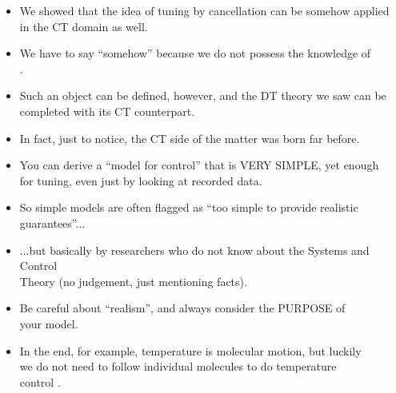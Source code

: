 \begin{frame}
\myPause
 \begin{itemize}[<+-| alert@+>]
 \item We showed that the idea of tuning by cancellation can be somehow applied\\
       in the CT domain as well.
 \item We have to say ``somehow'' because we do not possess the knowledge of\\
       .
 \item Such an object can be defined, however, and the DT theory we saw can be\\
       completed with its CT counterpart.
 \item In fact, just to notice, the CT side of the matter was born far before.
 \end{itemize}
\end{frame}

\begin{frame}
\myPause
 \begin{itemize}[<+-| alert@+>]
 \item You can derive a ``model for control'' that is VERY SIMPLE, yet enough\\
       for tuning, even just by looking at recorded data.
 \item So simple models are often flagged as ``too simple to provide realistic\\
       guarantees''...
 \item ...but basically by researchers who do not know about the Systems and Control\\
       Theory (no judgement, just mentioning facts).
 \item Be careful about ``realism'', and always consider the PURPOSE of\\
       your model.
 \item In the end, for example, temperature is molecular motion, but luckily\\
       we do not need to follow individual molecules to do temperature\\
       control \smiley.
 \end{itemize}
\end{frame}

